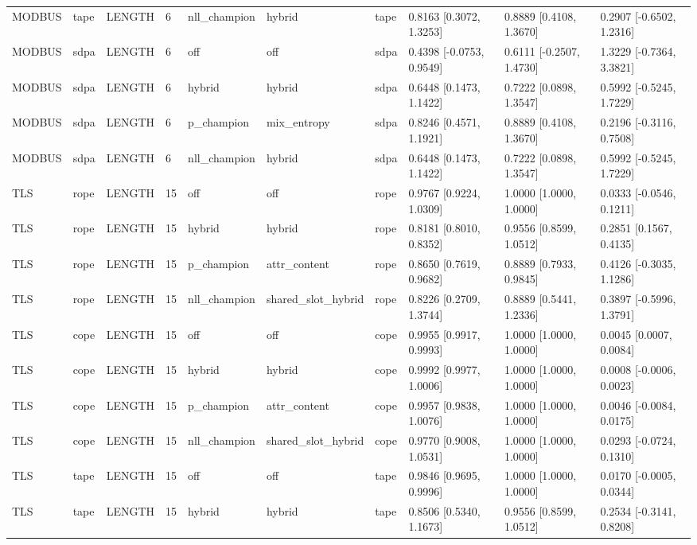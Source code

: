 \begin{tabular}{llllllllll}
MODBUS & tape & LENGTH & 6 & nll\_champion & hybrid & tape & 0.8163 [0.3072, 1.3253] & 0.8889 [0.4108, 1.3670] & 0.2907 [-0.6502, 1.2316] \\
MODBUS & sdpa & LENGTH & 6 & off & off & sdpa & 0.4398 [-0.0753, 0.9549] & 0.6111 [-0.2507, 1.4730] & 1.3229 [-0.7364, 3.3821] \\
MODBUS & sdpa & LENGTH & 6 & hybrid & hybrid & sdpa & 0.6448 [0.1473, 1.1422] & 0.7222 [0.0898, 1.3547] & 0.5992 [-0.5245, 1.7229] \\
MODBUS & sdpa & LENGTH & 6 & p\_champion & mix\_entropy & sdpa & 0.8246 [0.4571, 1.1921] & 0.8889 [0.4108, 1.3670] & 0.2196 [-0.3116, 0.7508] \\
MODBUS & sdpa & LENGTH & 6 & nll\_champion & hybrid & sdpa & 0.6448 [0.1473, 1.1422] & 0.7222 [0.0898, 1.3547] & 0.5992 [-0.5245, 1.7229] \\
TLS & rope & LENGTH & 15 & off & off & rope & 0.9767 [0.9224, 1.0309] & 1.0000 [1.0000, 1.0000] & 0.0333 [-0.0546, 0.1211] \\
TLS & rope & LENGTH & 15 & hybrid & hybrid & rope & 0.8181 [0.8010, 0.8352] & 0.9556 [0.8599, 1.0512] & 0.2851 [0.1567, 0.4135] \\
TLS & rope & LENGTH & 15 & p\_champion & attr\_content & rope & 0.8650 [0.7619, 0.9682] & 0.8889 [0.7933, 0.9845] & 0.4126 [-0.3035, 1.1286] \\
TLS & rope & LENGTH & 15 & nll\_champion & shared\_slot\_hybrid & rope & 0.8226 [0.2709, 1.3744] & 0.8889 [0.5441, 1.2336] & 0.3897 [-0.5996, 1.3791] \\
TLS & cope & LENGTH & 15 & off & off & cope & 0.9955 [0.9917, 0.9993] & 1.0000 [1.0000, 1.0000] & 0.0045 [0.0007, 0.0084] \\
TLS & cope & LENGTH & 15 & hybrid & hybrid & cope & 0.9992 [0.9977, 1.0006] & 1.0000 [1.0000, 1.0000] & 0.0008 [-0.0006, 0.0023] \\
TLS & cope & LENGTH & 15 & p\_champion & attr\_content & cope & 0.9957 [0.9838, 1.0076] & 1.0000 [1.0000, 1.0000] & 0.0046 [-0.0084, 0.0175] \\
TLS & cope & LENGTH & 15 & nll\_champion & shared\_slot\_hybrid & cope & 0.9770 [0.9008, 1.0531] & 1.0000 [1.0000, 1.0000] & 0.0293 [-0.0724, 0.1310] \\
TLS & tape & LENGTH & 15 & off & off & tape & 0.9846 [0.9695, 0.9996] & 1.0000 [1.0000, 1.0000] & 0.0170 [-0.0005, 0.0344] \\
TLS & tape & LENGTH & 15 & hybrid & hybrid & tape & 0.8506 [0.5340, 1.1673] & 0.9556 [0.8599, 1.0512] & 0.2534 [-0.3141, 0.8208] \\

\end{tabular}
